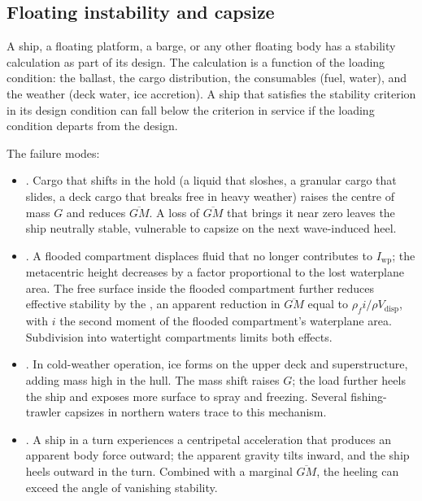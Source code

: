 \subsection{Floating instability and capsize}

A ship, a floating platform, a barge, or any other floating body
has a stability calculation as part of its design. The
calculation is a function of the loading condition: the ballast,
the cargo distribution, the consumables (fuel, water), and the
weather (deck water, ice accretion). A ship that satisfies the
stability criterion in its design condition can fall below the
criterion in service if the loading condition departs from the
design.

The failure modes:

\begin{itemize}[leftmargin=*]
  \item {}. Cargo
    that shifts in the hold (a liquid that sloshes, a granular
    cargo that slides, a deck cargo that breaks free in heavy
    weather) raises the centre of mass $G$ and reduces
    $\overline{GM}$. A loss of $\overline{GM}$ that brings it
    near zero leaves the ship neutrally stable, vulnerable to
    capsize on the next wave-induced heel.
  \item {}. A
    flooded compartment displaces fluid that no longer
    contributes to $I_{\text{wp}}$; the metacentric height
    decreases by a factor proportional to the lost waterplane
    area. The free surface inside the flooded compartment
    further reduces effective stability by the
    , an apparent reduction in
    $\overline{GM}$ equal to $\rho_f i/\rho V_{\text{disp}}$,
    with $i$ the second moment of the flooded compartment's
    waterplane area. Subdivision into watertight compartments
    limits both effects.
  \item {}. In cold-weather
    operation, ice forms on the upper deck and superstructure,
    adding mass high in the hull. The mass shift raises $G$;
    the load further heels the ship and exposes more surface to
    spray and freezing. Several fishing-trawler capsizes in
    northern waters trace to this mechanism.
  \item {}. A ship in a turn
    experiences a centripetal acceleration that produces an
    apparent body force outward; the apparent gravity tilts
    inward, and the ship heels outward in the turn. Combined
    with a marginal $\overline{GM}$, the heeling can exceed the
    angle of vanishing stability.
\end{itemize}

